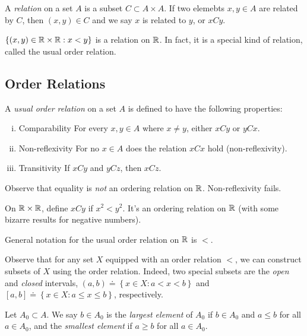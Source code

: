 \begin{definition}
	A \emph{relation} on a set $A$ is a subset $C \subset A \times A$.
	If two elemebts $x, y \in A$ are related by $C$, then $(x,y) \in C$ and 
	we say $x$ is related to $y$, or $xCy$.
\end{definition}
\begin{example}
	$\left\{ (x,y) \in \mathbb{R} \times \mathbb{R}: x<y \right\}$ is a relation on $\mathbb{R}$.
	In fact, it is a special kind of relation, called the usual order relation.
\end{example}

\subsection{Order Relations} 
\begin{definition}
 A \emph{usual order relation } on a set $A$ is defined to have the following
 properties:
 \begin{enumerate}[(i)]
	 \item{Comparability} For every $x,y \in A$ where $x \neq y$, either $xCy$ or $yCx$.
	 \item{Non-reflexivity} For no $x \in A$ does the relation $xCx$ hold (non-reflexivity).
		 \item{Transitivity} If $xCy$ and $yCz$, then $xCz$.
 \end{enumerate}
\end{definition}
\begin{remark}\label{rem:}
	Observe that equality is \emph{not} an ordering relation on $\mathbb{R}$. Non-reflexivity
	fails.
\end{remark}
\begin{example}
	On $\mathbb{R} \times \mathbb{R}$, define $xCy$ if $x^{2} < y^{2}$. It's an ordering
	relation on $\mathbb{R}$ (with some bizarre results for negative numbers).
\end{example}
\begin{notation}
	General notation for the usual order relation on $\mathbb{R}$ is $<$.
\end{notation}
Observe that for any set $X$ equipped with an order relation $<$, we can
construct subsets of $X$ using the order relation. Indeed, two special
subsets are the \emph{open} and \emph{closed} intervals,
$(a,b)\doteq \left\{ x \in X: a < x < b \right\}$ and $[a,b] \doteq \left\{ x
	\in X: a \le x \le b
\right\}$, respectively.

Let $A_{0}  \subset A$. We say $b \in A_{0}$ is the \emph{largest element} of
$A_{0}$ if $b \in A_{0}$ and $a \le b$ for all $a \in A_{0}$, and the 
\emph{smallest element} if $a \ge b$ for all $a \in A_{0}$.


